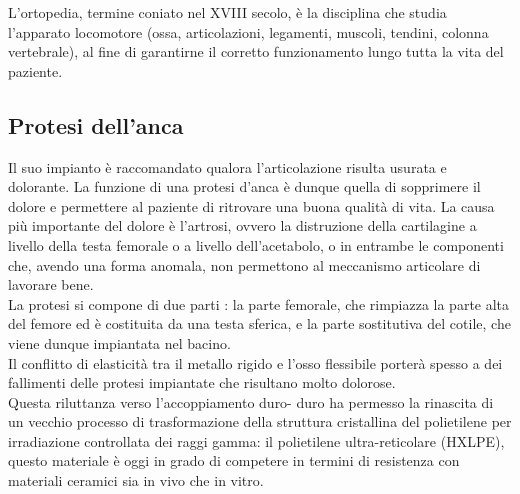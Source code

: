 \documentclass[a4paper]{article}
\begin{document}
L’ortopedia, termine coniato nel XVIII secolo, è la disciplina che studia l’apparato locomotore (ossa,
articolazioni, legamenti, muscoli, tendini, colonna vertebrale), al fine di garantirne il corretto funzionamento
lungo tutta la vita del paziente.

\subsection{Protesi dell'anca}
Il suo impianto è raccomandato qualora l’articolazione risulta usurata e dolorante. La funzione di una protesi
d’anca è dunque quella di sopprimere il dolore e permettere al paziente di ritrovare una buona qualità di vita.
La causa più importante del dolore è l’artrosi, ovvero la distruzione della cartilagine a livello della testa
femorale o a livello dell’acetabolo, o in entrambe le componenti che, avendo una forma anomala, non
permettono al meccanismo articolare di lavorare bene. \\
La protesi si compone di due parti : la parte femorale, che rimpiazza la parte alta del femore ed è costituita
da una testa sferica, e la parte sostitutiva del cotile, che viene dunque impiantata nel bacino. \\
Il conflitto di elasticità tra il metallo rigido e l’osso flessibile porterà spesso a dei fallimenti delle protesi
impiantate che risultano molto dolorose. \\ 
Questa riluttanza verso l’accoppiamento duro-
duro ha permesso la rinascita di un vecchio processo di trasformazione della struttura cristallina del
polietilene per irradiazione controllata dei raggi gamma: il polietilene ultra-reticolare (HXLPE), questo
materiale è oggi in grado di competere in termini di resistenza con materiali ceramici sia in vivo che in vitro. \\
\end{document}
